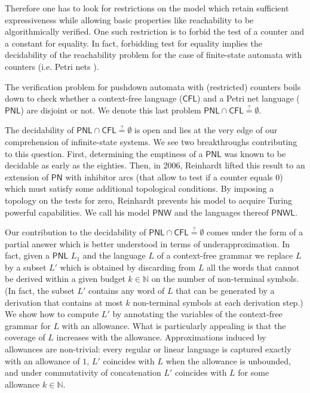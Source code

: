 \documentclass{fsttcs}
\def\nats{{\mathbb{N}}}
\def\cfl{\mathsf{CFL}}
\def\pn{\mathsf{PN}}
\def\pnl{\mathsf{PNL}}
\def\pnw{\mathsf{PNW}}
\def\pnwl{\mathsf{PNWL}}
\begin{document}
Therefore one has to look for restrictions on the model which retain sufficient
expressiveness while allowing basic properties like reachability to be
algorithmically verified. One such restriction is to forbid the test of a
counter and a constant for equality.  In fact, forbidding test for equality
implies the decidability of the reachability problem  for the case of finite-state
automata with counters (i.e. Petri nets \cite{LEROUX-POPL2011,Reinhardt}). 

The verification problem  for pushdown automata with (restricted) counters
boils down to check whether a context-free language (\(\cfl\)) and a Petri net
language (\(\pnl\)) are disjoint or not. We denote this last problem
\(\pnl\cap\cfl\stackrel{?}{=}\emptyset\). 
 





The decidability of \(\pnl\cap\cfl\stackrel{?}{=}\emptyset\) is open and lies at the very edge of our
comprehension of infinite-state systems.  We see two breakthroughs contributing
to this question.  First, determining the emptiness of a \(\pnl\) was known to
be decidable as early as the eighties. Then, in 2006, Reinhardt
\cite{Reinhardt} lifted this result to an extension of \(\pn\) with inhibitor
arcs (that allow to test if a counter equals 0) {which must satisfy some
additional topological conditions. By imposing a topology on the tests for
zero,} Reinhardt prevents his model to acquire Turing powerful capabilities. We
call his model \(\pnw\) and the languages thereof \(\pnwl\).



Our contribution to the decidability of \(\pnl\cap\cfl\stackrel{?}{=}\emptyset\) comes under the form
of a partial answer which is better understood in terms of underapproximation.
In fact, given a \(\pnl\) \(L_1\) and the language \(L\) of a context-free
grammar we replace \(L\) by a subset \(L'\) which is obtained by discarding
from \(L\) all the words that cannot be derived within a given budget $k \in \mathbb{N}$ on the
number of non-terminal symbols. (In fact, the subset $L'$  contains any word of $L$ that can be generated  by a  derivation  that  contains at most $k$ non-terminal symbols at each derivation step.)  We show how to compute \(L'\) by annotating the
variables of the context-free grammar for \(L\) with an allowance. What is
particularly appealing is that the coverage of \(L\) increases with the allowance.
{Approximations induced by allowances are non-trivial: every regular or
linear language is captured exactly with an allowance of \(1\), \(L'\) coincides with \(L\)
when the allowance is unbounded, and under commutativity of concatenation
\(L'\) coincides with \(L\) for some allowance
\(k\in\nats\).}
\end{document}
